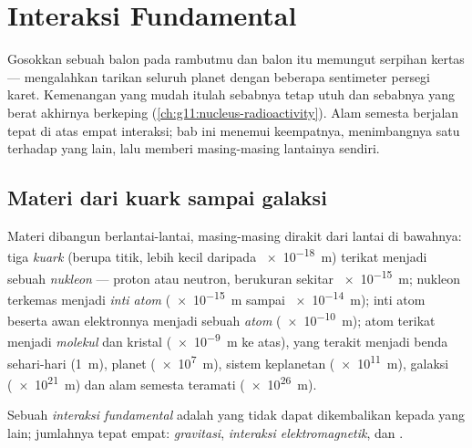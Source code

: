 \chapter{Interaksi Fundamental}\label{ch:g11:fundamental-interactions}

Gosokkan sebuah balon pada rambutmu dan balon itu memungut serpihan
kertas --- mengalahkan tarikan  seluruh planet dengan beberapa
sentimeter persegi karet. Kemenangan yang mudah itulah sebabnya 
tetap utuh dan sebabnya  yang berat akhirnya berkeping
(\cref{ch:g11:nucleus-radioactivity}). Alam semesta berjalan tepat di
atas empat interaksi; bab ini menemui keempatnya, menimbangnya satu
terhadap yang lain, lalu memberi masing-masing lantainya sendiri.

\section{Materi dari kuark sampai galaksi}

\begin{definition}\label{def:g11:fundamental-interactions:ladder}
Materi dibangun berlantai-lantai, masing-masing dirakit dari lantai di
bawahnya: tiga \emph{kuark} (berupa titik, lebih kecil
daripada \qty{e-18}{m}) terikat menjadi sebuah
\emph{nukleon} --- proton atau neutron, berukuran sekitar
\qty{e-15}{m}; nukleon terkemas menjadi \emph{inti
atom} (\qty{e-15}{m} sampai \qty{e-14}{m}); inti atom
beserta awan elektronnya menjadi sebuah \emph{atom}
(\qty{e-10}{m}); atom terikat menjadi \emph{molekul} dan
kristal (\qty{e-9}{m} ke atas), yang terakit menjadi benda sehari-hari
(\qty{1}{m}), planet (\qty{e7}{m}), sistem keplanetan (\qty{e11}{m}),
galaksi (\qty{e21}{m}) dan alam semesta teramati (\qty{e26}{m}).
\end{definition}

\begin{definition}\label{def:g11:fundamental-interactions:four}
Sebuah \emph{interaksi fundamental} adalah
 yang tidak dapat dikembalikan kepada  yang lain; jumlahnya
tepat empat: \emph{gravitasi}, \emph{interaksi
elektromagnetik},  dan
.
\end{definition}

